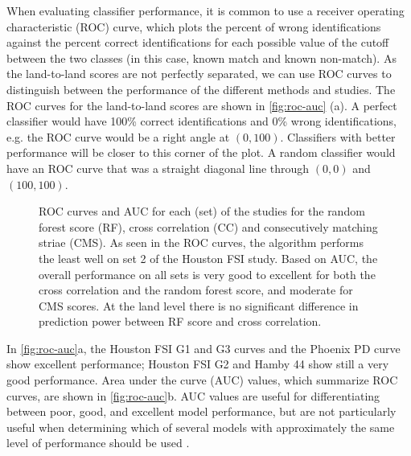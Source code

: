 \documentclass[doubleblind]{elsarticle}\usepackage[]{graphicx}\usepackage[]{color}
\newenvironment{knitrout}{}{} %
\begin{document}
When evaluating classifier performance, it is common to use a receiver operating characteristic (ROC) curve, which plots the percent of wrong identifications against the percent correct identifications for each possible value of the cutoff between the two classes (in this case, known match and known non-match). As the land-to-land scores are not perfectly separated, we can use ROC curves to distinguish between the performance of the different methods and studies. The ROC curves for the land-to-land scores are shown in \autoref{fig:roc-auc} (a). A perfect classifier would have 100\% correct identifications and 0\% wrong identifications, e.g. the ROC curve would be a right angle at $(0, 100)$. Classifiers with better performance will be closer to this corner of the plot. A random classifier would have an ROC curve that was a straight diagonal line through $(0,0)$ and $(100,100)$.










\begin{knitrout}
\color{fgcolor}\begin{figure}

{\centering {}

}

\caption[ROC curves and AUC for each (set) of the studies for the random forest score (RF), cross correlation (CC) and consecutively matching striae (CMS)]{ROC curves and AUC for each (set) of the studies for the random forest score (RF), cross correlation (CC) and consecutively matching striae (CMS).   As seen in the ROC curves, the algorithm performs the least well on set 2 of the Houston FSI study. Based on AUC, the overall performance on all sets is very good to excellent for both the cross correlation and the random forest score, and moderate for CMS scores. At the land level there is no significant difference in prediction power between RF score and cross correlation.}\label{fig:roc-auc}
\end{figure}


\end{knitrout}

In \autoref{fig:roc-auc}a, the Houston FSI G1 and G3 curves and the Phoenix PD curve show excellent performance; Houston FSI G2 and Hamby 44 show still a very  good performance. Area under the curve (AUC) values, which summarize ROC curves, are shown in \autoref{fig:roc-auc}b. AUC values are useful for differentiating between poor, good, and excellent model performance, but are not particularly useful when determining which of several models with approximately the same level of performance should be used \citep{marzban_roc_2004}. %
\end{document}
